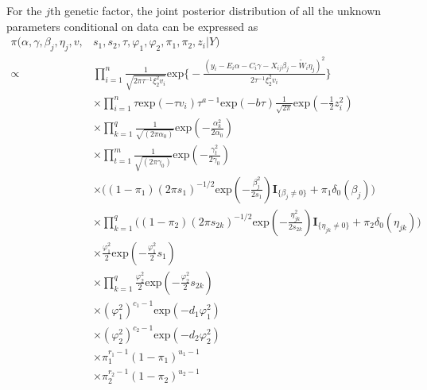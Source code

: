 \documentclass[12pt]{article}
\begin{document}
For the $j$th genetic factor, the joint posterior distribution of all the unknown parameters conditional on data can be expressed as
\begin{equation*}\label{equr:full}
\begin{aligned}
\pi(\alpha, \gamma, \beta_{j}, \eta_{j}, v, &s_1, s_2, \tau, \varphi_1, \varphi_2, \pi_1, \pi_2, z_i| Y)\\
\propto &  \prod_{i=1}^{n} \frac{1}{\sqrt{2\pi \tau^{-1} \xi_{2}^{2} v_i}} 
\text{exp}\Big\{- \frac{(y_i - E_i \alpha - C_i \gamma - X_{ij}\beta_{j} - \tilde{W}_{i}\eta_{j})^2}{2 \tau^{-1} \xi_{2}^{2} v_i} \Big\} \\
& \times \prod_{i=1}^{n}\tau \text{exp}(- \tau v_{i})\tau^{a-1}\text{exp}(-b\tau) \frac{1}{\sqrt{2\pi}} \text{exp}(-\frac{1}{2} z_{i}^2)\\
& \times \prod_{k=1}^{q}\frac{1}{\sqrt{(2\pi \alpha_0)}}\text{exp}(-\frac{\alpha_{k}^2}{2\alpha_0})\\
& \times \prod_{t=1}^{m}\frac{1}{\sqrt{(2\pi \gamma_0)}}\text{exp}(-\frac{\gamma_{t}^2}{2\gamma_0})\\
& \times \Big( (1-\pi_1)(2\pi s_1)^{-1/2} \text{exp}(-\frac{\beta_{j}^{2}}{2 s_1})\textbf{I}_{\{\beta_{j} \neq 0\}} + \pi_1 \delta_0(\beta_{j})  \Big) \\
& \times \prod_{k=1}^{q}\Big( (1-\pi_2)(2\pi s_{2k})^{-1/2} \text{exp}(-\frac{\eta_{jk}^{2}}{2 s_{2k}})\textbf{I}_{\{\eta_{jk} \neq 0\}} + \pi_2 \delta_0(\eta_{jk})  \Big) \\
& \times \frac{\varphi_{1}^{2}}{2}\text{exp}({-\frac{\varphi_{1}^{2}}{2}}s_{1})\\
& \times \prod_{k=1}^{q} \frac{\varphi_{2}^{2}}{2}\text{exp}({-\frac{\varphi_{2}^{2}}{2}}s_{2k})\\
& \times (\varphi_{1}^{2})^{c_1-1}\text{exp}(-d_1\varphi_{1}^{2})\\
& \times (\varphi_{2}^{2})^{c_2-1}\text{exp}(-d_2\varphi_{2}^{2})\\
& \times \pi_{1}^{r_1-1}(1-\pi_1)^{u_1-1}\\
& \times \pi_{2}^{r_2-1}(1-\pi_2)^{u_2-1}\\
\end{aligned}
\end{equation*}
\end{document}
